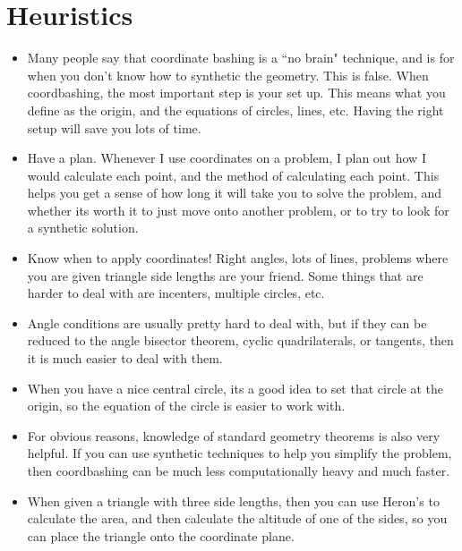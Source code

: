 \documentclass{article}
\begin{document}
\section{Heuristics}
\begin{itemize}
    \item Many people say that coordinate bashing is a ``no brain" technique, and is for when you don't know how to synthetic the geometry. This is false. When coordbashing, the most important step is your set up. This means what you define as the origin, and the equations of circles, lines, etc. Having the right setup will save you lots of time.
    \item Have a plan. Whenever I use coordinates on a problem, I plan out how I would calculate each point, and the method of calculating each point. This helps you get a sense of how long it will take you to solve the problem, and whether its worth it to just move onto another problem, or to try to look for a synthetic solution. 
    \item Know when to apply coordinates! Right angles, lots of lines, problems where you are given triangle side lengths are your friend. Some things that are harder to deal with are incenters, multiple circles, etc.
    \item Angle conditions are usually pretty hard to deal with, but if they can be reduced to the angle bisector theorem, cyclic quadrilaterals, or tangents, then it is much easier to deal with them. 
    \item When you have a nice central circle, its a good idea to set that circle at the origin, so the equation of the circle is easier to work with.
    \item For obvious reasons, knowledge of standard geometry theorems is also very helpful. If you can use synthetic techniques to help you simplify the problem, then coordbashing can be much less computationally heavy and much faster. 
    \item When given a triangle with three side lengths, then you can use Heron's to calculate the area, and then calculate the altitude of one of the sides, so you can place the triangle onto the coordinate plane. 
\end{itemize}
\end{document}

